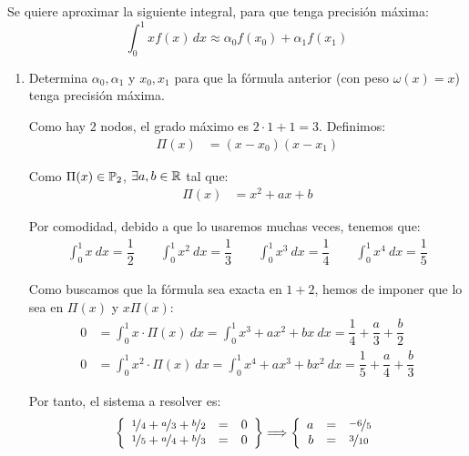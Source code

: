 \begin{ejercicio} \label{ej:2.1.30}
    Se quiere aproximar la siguiente integral, para que tenga precisión máxima:
    \begin{equation*}
        \int_0^1 xf(x) \, dx\approx \alpha_0 f(x_0) + \alpha_1 f(x_1)
    \end{equation*}
    \begin{enumerate}
        \item Determina $\alpha_0, \alpha_1$ y $x_0, x_1$ para que la fórmula anterior (con peso $\omega(x)=x$) tenga precisión máxima.
        
        Como hay $2$ nodos, el grado máximo es $2\cdot 1+1=3$.
        Definimos:
        \begin{align*}
            \Pi(x) &= (x-x_0)(x-x_1)
        \end{align*}

        Como $\Pi(x)\in \mathbb{P}_2$, $\exists a,b\in \mathbb{R}$ tal que:
        \begin{align*}
            \Pi(x) &= x^2+ax+b
        \end{align*}

        Por comodidad, debido a que lo usaremos muchas veces, tenemos que:
        \begin{align*}
            \int_0^1 x\ dx = \dfrac{1}{2}\qquad 
            \int_0^1 x^2\ dx = \dfrac{1}{3}\qquad
            \int_0^1 x^3\ dx = \dfrac{1}{4}\qquad
            \int_0^1 x^4\ dx = \dfrac{1}{5}
        \end{align*}

        Como buscamos que la fórmula sea exacta en $1+2$, hemos de imponer que lo sea en $\Pi(x)$ y $x\Pi(x)$:
        \begin{align*}
            0 &= \int_0^1 x\cdot \Pi(x)\ dx = \int_0^1 x^3 + ax^2 + bx\ dx
            = \dfrac{1}{4} + \dfrac{a}{3} + \dfrac{b}{2}\\
            0 &= \int_0^1 x^2\cdot \Pi(x)\ dx = \int_0^1 x^4 + ax^3 + bx^2\ dx
            = \dfrac{1}{5} + \dfrac{a}{4} + \dfrac{b}{3}
        \end{align*}

        Por tanto, el sistema a resolver es:
        \begin{equation*}
            \left\{
            \begin{array}{rcl}
                \nicefrac{1}{4} + \nicefrac{a}{3} + \nicefrac{b}{2} &=& 0\\
                \nicefrac{1}{5} + \nicefrac{a}{4} + \nicefrac{b}{3} &=& 0
            \end{array}
            \right\}\Longrightarrow
            \left\{
                \begin{array}{rcl}
                    a&=&\nicefrac{-6}{5}\\
                    b&=&\nicefrac{3}{10}
                \end{array}
            \right.
        \end{equation*}


\end{enumerate}
\end{ejercicio}
